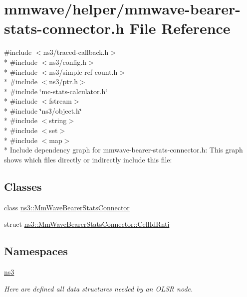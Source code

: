 \hypertarget{mmwave-bearer-stats-connector_8h}{}\section{mmwave/helper/mmwave-\/bearer-\/stats-\/connector.h File Reference}
\label{mmwave-bearer-stats-connector_8h}
{\ttfamily \#include $<$ns3/traced-\/callback.\+h$>$}\\*
{\ttfamily \#include $<$ns3/config.\+h$>$}\\*
{\ttfamily \#include $<$ns3/simple-\/ref-\/count.\+h$>$}\\*
{\ttfamily \#include $<$ns3/ptr.\+h$>$}\\*
{\ttfamily \#include \char`\"{}mc-\/stats-\/calculator.\+h\char`\"{}}\\*
{\ttfamily \#include $<$fstream$>$}\\*
{\ttfamily \#include \char`\"{}ns3/object.\+h\char`\"{}}\\*
{\ttfamily \#include $<$string$>$}\\*
{\ttfamily \#include $<$set$>$}\\*
{\ttfamily \#include $<$map$>$}\\*
Include dependency graph for mmwave-\/bearer-\/stats-\/connector.h\+:
This graph shows which files directly or indirectly include this file\+:
\subsection*{Classes}
\begin{DoxyCompactItemize}
\item 
class \hyperlink{classns3_1_1MmWaveBearerStatsConnector}{ns3\+::\+Mm\+Wave\+Bearer\+Stats\+Connector}
\item 
struct \hyperlink{structns3_1_1MmWaveBearerStatsConnector_1_1CellIdRnti}{ns3\+::\+Mm\+Wave\+Bearer\+Stats\+Connector\+::\+Cell\+Id\+Rnti}
\end{DoxyCompactItemize}
\subsection*{Namespaces}
\begin{DoxyCompactItemize}
\item 
 \hyperlink{namespacens3}{ns3}
\begin{DoxyCompactList}\small\item\em Here are defined all data structures needed by an O\+L\+SR node. \end{DoxyCompactList}\end{DoxyCompactItemize}

